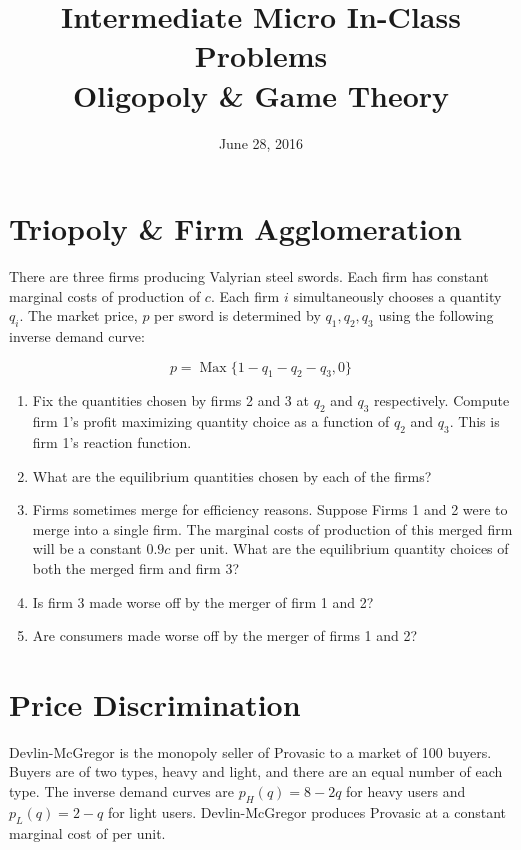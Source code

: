 \documentclass{article}
\DeclareMathOperator*{\Max}{Max}
\begin{document}
\title{Intermediate Micro In-Class Problems \\ \large Oligopoly \& Game Theory}

\date{June 28, 2016}

\maketitle

\section*{Triopoly \& Firm Agglomeration}

There are three firms producing Valyrian steel swords. Each firm has constant marginal costs of production of $c$. Each firm $i$ simultaneously chooses a quantity $q_i$. The market price, $p$ per sword is determined by $q_1, q_2, q_3$ using the following inverse demand curve:

\[ p = \Max \{1 - q_1-q_2-q_3, 0\} \]

\begin{enumerate}
\item Fix the quantities chosen by firms 2 and 3 at $q_2$ and $q_3$ respectively. Compute firm 1's profit maximizing quantity choice as a function of $q_2$ and $q_3$. This is firm 1's reaction function.
\item What are the equilibrium quantities chosen by each of the firms?
\item Firms sometimes merge for efficiency reasons. Suppose Firms 1 and 2 were to merge into a single firm. The marginal costs of production of this merged firm will be a constant $0.9c$ per unit. What are the equilibrium quantity choices of both the merged firm and firm 3?
\item Is firm 3 made worse off by the merger of firm 1 and 2?
\item Are consumers made worse off by the merger of firms 1 and 2?
\end{enumerate}

\section*{Price Discrimination}

Devlin-McGregor is the monopoly seller of Provasic to a market of 100 buyers. Buyers are of two types, heavy and light, and there are an equal number of each type. The inverse demand curves are $p_H(q) = 8 - 2q$ for heavy users and $p_L(q) = 2-q$ for light users. Devlin-McGregor produces Provasic at a constant marginal cost of  per unit.
\end{document}
